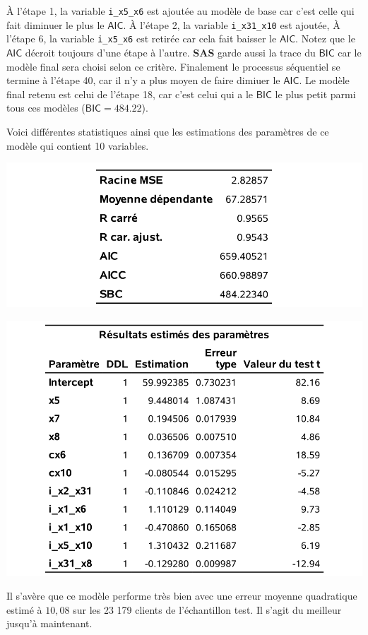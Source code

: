 \documentclass[
  11pt,
  letterpaper,
]{book}
\theoremstyle{definition}
\theoremstyle{definition}
\theoremstyle{definition}
\theoremstyle{remark}
\begin{document}
À l'étape 1, la variable \texttt{i\_x5\_x6} est ajoutée au modèle de base car c'est celle qui fait diminuer le plus le \(\mathsf{AIC}\). À l'étape 2, la variable \texttt{i\_x31\_x10} est ajoutée, À l'étape 6, la variable \texttt{i\_x5\_x6} est retirée car cela fait baisser le \(\mathsf{AIC}\). Notez que le \(\mathsf{AIC}\) décroit toujours d'une étape à l'autre. \textbf{SAS} garde aussi la trace du \(\mathsf{BIC}\) car le modèle final sera choisi selon ce critère. Finalement le processus séquentiel se termine à l'étape 40, car il n'y a plus moyen de faire dimiuer le \(\mathsf{AIC}\). Le modèle final retenu est celui de l'étape 18, car c'est celui qui a le \(\mathsf{BIC}\) le plus petit parmi tous ces modèles (\(\mathsf{BIC}=484.22\)).

Voici différentes statistiques ainsi que les estimations des paramètres de ce modèle qui contient 10 variables.

\begin{center}\includegraphics[width=0.65\linewidth]{figures/02-select-e14} \end{center}

\begin{center}\includegraphics[width=0.7\linewidth]{figures/02-select-e15} \end{center}

Il s'avère que ce modèle performe très bien avec une erreur moyenne quadratique estimé à \(10,08\) sur les 23 179 clients de l'échantillon test. Il s'agit du meilleur jusqu'à maintenant.
\end{document}
